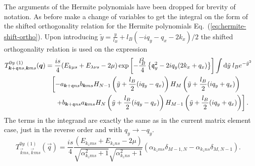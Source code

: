 The arguments of the Hermite polynomials have been dropped for brevity of notation.
As before make a change of variables to get the integral on the form of the shifted orthogonality relation for the Hermite polynomials Eq.~(\ref{eq:hermite-shift-ortho}).
Upon introducing $\tilde{y} = \frac{y}{l_{B}} + l_B( -iq_y - q_x - 2k_x) / 2$ the shifted orthogonality relation is used on the expression
\begin{equation}
  \label{eq:54}
  \begin{split}
    T^{0y \;(1)}_{\bm{k}+\mathfrak{q}ns, \bm{k}ms} (\bm{q})
    &= \frac{i s}{4}
    (E_{k \mu s} + E_{\lambda \nu s}- 2\mu )
    \exp \left[
      -\frac{l_B^2}{4} \left\{ \mathfrak{q}_y^2- 2 i q_y (2 k_x + q_x) \right\}
    \right]
    \int \mathrm{d}\tilde{y} \; l_B
    e^{-\tilde{y}^2}\\
    &\phantom{=} \left[
      - a_{\bm{k}+\mathfrak{q} ns} b_{\bm{k} ms}
      H_{N-1} \left( \tilde{y} + \frac{l_B}{2} ( iq_y - q_x) \right)
      H_M \left( \tilde{y} + \frac{l_B}{2} (iq_y + q_x) \right)\right.\\
      &\phantom{=\big[} \left.+ b_{\bm{k}+\mathfrak{q} ns} a_{\bm{k}ms}
      H_N \left( \tilde{y} + \frac{l_B}{2} ( iq_y - q_x) \right)
      H_{M-1} \left( \tilde{y} + \frac{l_B}{2} (iq_y + q_x) \right)
    \right].
  \end{split}
\end{equation}
The terms in the integrand are exactly the same as in the current matrix element case, just in the reverse order and with $q_y \to -q_y$.
\begin{equation}
  \label{eq:55}
  T^{0y \;(1)}_{\vec{k} ns, \vec{k}ms} (\vec{q})
  = \frac{i s}{4}
  \frac{
    (E_{k_z m s} + E_{k_z n s}- 2\mu )
  }{
    \sqrt{\alpha _{k_zms}^2 +1}
    \sqrt{\alpha _{k_zns}^2 + 1}
  }
  \left(
    \alpha _{k_z m s}
    \delta_{M-1, N}
    -
    \alpha _{k_z n s}
    \delta_{M, N-1}
  \right).
\end{equation}

